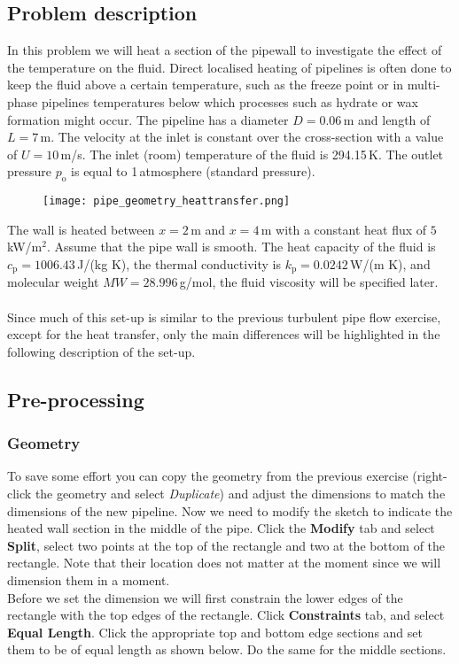 \documentclass[11pt,a4paper,oneside]{scrartcl}
\newcommand\bfr[1]{\textcolor[rgb]{1,0.00,0.00}{\textbf{\textsf{#1}}}}
\begin{document}
\subsection{Problem description}

In this problem we will heat a section of the pipewall to investigate the effect of the temperature on the fluid. Direct localised heating of pipelines is often done to keep the fluid  above a certain temperature, such as the freeze point or in multi-phase pipelines temperatures below which processes such as hydrate or wax formation might occur. The pipeline has a diameter $D=0.06$\,m and  length of $L=7$\,m. The velocity at the inlet is constant over the cross-section with a value of $U=10$\,m/s. The inlet (room) temperature of the fluid is 294.15\,K. The outlet pressure $p_\mathrm{o}$ is equal to 1\,atmosphere (standard pressure).\\

\begin{figure}[H]
\begin{center}
    \texttt{[image: pipe\_geometry\_heattransfer.png]}
\end{center}
\end{figure}

The wall is heated between $x=2$\,m and $x=4\,$m with a constant heat flux of $5\,$kW/m$^2$. Assume that the pipe wall   is smooth. The heat capacity of the fluid is $c_\mathrm{p}=1006.43\,$J/(kg K), the thermal conductivity is $k_\mathrm{p}=0.0242$\,W/(m K), and molecular weight $MW=28.996$\,g/mol, the fluid viscosity will be specified later.
\\
\\
Since much of this set-up is similar to the previous turbulent pipe flow exercise, except for the heat transfer, only the main differences will be highlighted in the following description of the set-up.

\subsection{Pre-processing}

\subsubsection*{Geometry}
To save some effort you can copy the geometry from the previous exercise (right-click the geometry and select \emph{Duplicate}) and adjust the dimensions to match the dimensions of the new pipeline. Now we need to modify the sketch to  indicate the heated wall section in the middle of the pipe. Click the \bfr{Modify} tab and select \bfr{Split}, select two points at the top of the rectangle and two at the bottom of the rectangle. Note that their location does not matter at the moment since we will dimension them in a moment.\\
Before we set the dimension we will first constrain the lower edges of the rectangle with the top edges of the rectangle. Click \bfr{Constraints} tab, and select \bfr{Equal Length}. Click the appropriate top and bottom edge sections and set them to be of equal length as shown below. Do the same for the middle sections.
\end{document}
